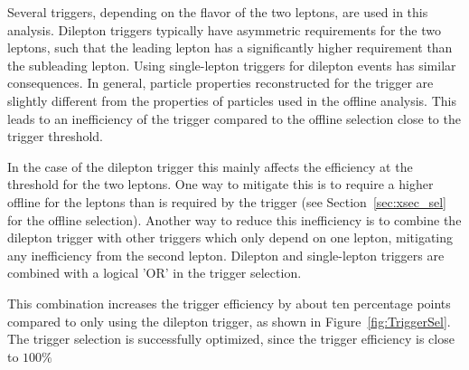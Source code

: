 Several triggers, depending on the flavor of the
two leptons, are used in this analysis. Dilepton triggers typically have asymmetric \pt requirements for the two leptons, such that the leading lepton has a significantly higher \pt requirement than
the subleading lepton. Using single-lepton triggers for dilepton events has similar consequences. In general, particle properties reconstructed for the trigger are slightly different from the properties of particles used in the offline analysis. This
leads to an inefficiency of the trigger compared to the offline selection close to the trigger threshold.

In the case of the dilepton trigger this mainly affects the efficiency at the \pt threshold for the two leptons. One way to mitigate this is to
require a higher offline \pt for the leptons than is required by the trigger (see Section~\ref{sec:xsec_sel} for the offline selection).
Another way to reduce this inefficiency is to combine the dilepton trigger with other triggers which only depend on one lepton, mitigating any
inefficiency from the second lepton. Dilepton and single-lepton triggers are combined with a logical 'OR' in the trigger selection.

This combination increases the trigger efficiency by about ten percentage points compared to only using the dilepton trigger, as shown in Figure~\ref{fig:TriggerSel}.
The trigger selection is successfully optimized, since the trigger efficiency is close to $100\%$


